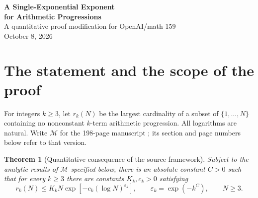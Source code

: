 \documentclass[11pt,a4paper]{article}
\newtheorem{theorem}{Theorem}[section]
\theoremstyle{definition}
\newcommand{\M}{\mathcal M}
\begin{document}
\begin{center}
{\Large\bfseries A Single-Exponential Exponent\\[3pt]
for Arithmetic Progressions}\\[7pt]
{\normalsize A quantitative proof modification for OpenAI/math 159}\\[5pt]
{\small October 8, 2026}
\end{center}

\begin{abstract}
This note quantifies the exponent in the density bound of
\emph{Quasipolynomial Bounds for Arithmetic Progressions}
(OpenAI/math, September 23, 2026). Relative to that manuscript's
analytic framework, we obtain
\(\varepsilon_k=\exp(-k^C)\), for an absolute constant \(C\).
The proof keeps a polynomial geometric degree and replaces two
sequential inverse-theorem chains by degree descents. A direct
Cauchy--Schwarz calculation integrates supplied derivative correlators,
while effective nilpotent cube completion removes one vertex in
relative detection. Separating structural dimension from logarithmic
precision controls the remaining branching arguments. The geometric
and analytic modifications and the final numerical schedule are given
explicitly, relative to the source results listed below.
\end{abstract}

\section{The statement and the scope of the proof}\label{sec:result}

For integers \(k\ge3\), let \(r_k(N)\) be the largest cardinality of a
subset of \(\{1,\ldots,N\}\) containing no nonconstant \(k\)-term
arithmetic progression. All logarithms are natural. Write \(\M\) for the
198-page manuscript \cite{openai}; its section and page numbers below
refer to that version.

\begin{theorem}[Quantitative consequence of the source framework]\label{thm:main}
Subject to the analytic results of \(\M\) specified below, there is an
absolute constant \(C>0\) such that for every \(k\ge3\) there are
constants \(K_k,c_k>0\) satisfying
\begin{equation}\label{eq:main}
 r_k(N)\le K_k N\exp\!\left[-c_k(\log N)^{\varepsilon_k}\right],
 \qquad \varepsilon_k=\exp(-k^C),\qquad N\ge3.
\end{equation}
\end{theorem}
\end{document}

